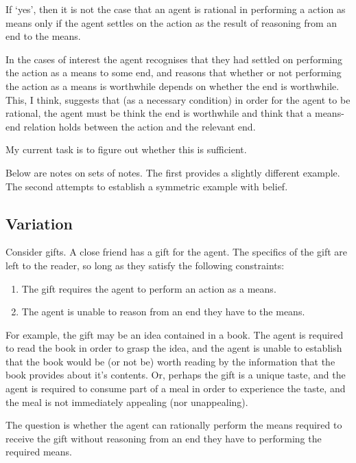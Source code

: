 \documentclass[10pt]{article}
\begin{document}
If `yes', then it is not the case that an agent is rational in performing a action as means only if the agent settles on the action as the result of reasoning from an end to the means.

In the cases of interest the agent recognises that they had settled on performing the action as a means to some end, and reasons that whether or not performing the action as a means is worthwhile depends on whether the end is worthwhile.
This, I think, suggests that (as a necessary condition) in order for the agent to be rational, the agent must be think the end is worthwhile and think that a means-end relation holds between the action and the relevant end.

My current task is to figure out whether this is sufficient.

Below are notes on sets of notes.
The first provides a slightly different example.
The second attempts to establish a symmetric example with belief.

\subsection{Variation}
\label{sec:variation}

Consider gifts.
A close friend has a gift for the agent.
The specifics of the gift are left to the reader, so long as they satisfy the following constraints:
\begin{enumerate}
\item\label{gift:means} The gift requires the agent to perform an action as a means.
\item\label{gift:relation} The agent is unable to reason from an end they have to the means.
\end{enumerate}

For example, the gift may be an idea contained in a book.
The agent is required to read the book in order to grasp the idea, and the agent is unable to establish that the book would be (or not be) worth reading by the information that the book provides about it's contents.
Or, perhaps the gift is a unique taste, and the agent is required to consume part of a meal in order to experience the taste, and the meal is not immediately appealing (nor unappealing).

The question is whether the agent can rationally perform the means required to receive the gift without reasoning from an end they have to performing the required means.
\end{document}

